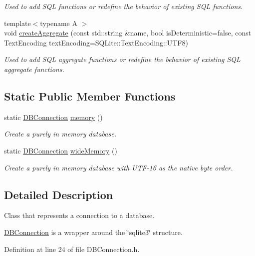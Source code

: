 \begin{DoxyCompactItemize}
\begin{DoxyCompactList}\small\item\em Used to add S\-Q\-L functions or redefine the behavior of existing S\-Q\-L functions. \end{DoxyCompactList}\item 
{\footnotesize template$<$typename A $>$ }\\void \hyperlink{a00004_aafcfe62eae1364129c3346500f6ad5d2}{create\-Aggregate} (const std\-::string \&name, bool is\-Deterministic=false, const Text\-Encoding text\-Encoding=S\-Q\-Lite\-::\-Text\-Encoding\-::\-U\-T\-F8)
\begin{DoxyCompactList}\small\item\em Used to add S\-Q\-L aggregate functions or redefine the behavior of existing S\-Q\-L aggregate functions. \end{DoxyCompactList}\end{DoxyCompactItemize}
\subsection*{Static Public Member Functions}
\begin{DoxyCompactItemize}
\item 
static \hyperlink{a00004}{D\-B\-Connection} \hyperlink{a00004_a5bd49a76155ffede0dca70f54c794159}{memory} ()
\begin{DoxyCompactList}\small\item\em Create a purely in memory database. \end{DoxyCompactList}\item 
static \hyperlink{a00004}{D\-B\-Connection} \hyperlink{a00004_a40beb5c2c30cd861a8b7c743b5e8881e}{wide\-Memory} ()
\begin{DoxyCompactList}\small\item\em Create a purely in memory database with U\-T\-F-\/16 as the native byte order. \end{DoxyCompactList}\end{DoxyCompactItemize}


\subsection{Detailed Description}
Class that represents a connection to a database. 

\hyperlink{a00004}{D\-B\-Connection} is a wrapper around the \char`\"{}sqlite3\char`\"{} structure. 

Definition at line 24 of file D\-B\-Connection.\-h.



